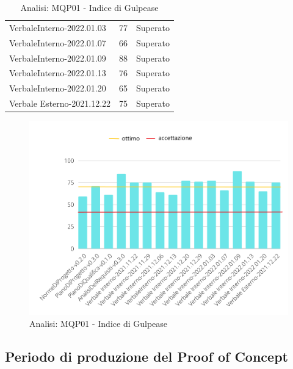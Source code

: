 \begin{table}[H]
\begin{tabular}{m{}<{\centering}  m{}<{\centering}  m{}<{\centering} }
            VerbaleInterno-2022.01.03&
            77 &
            Superato \\
            
            VerbaleInterno-2022.01.07&
            66 &
            Superato \\
            
            VerbaleInterno-2022.01.09&
            88 &
            Superato \\
            
            VerbaleInterno-2022.01.13&
            76 &
            Superato \\
            
            VerbaleInterno-2022.01.20&
            65 &
            Superato \\

            Verbale Esterno-2021.12.22&
            75&
            Superato \\
            
    
    \end{tabular}
    \caption{Periodo di analisi MQP01}

	\begin{figure}[H]
        \centering
        \includegraphics[scale=0.50]{Sezioni/images/analisi-gulpease.png}
        \caption{Analisi: MQP01 - Indice di Gulpease}
    \end{figure}
\end{table}

\subsection{Periodo di produzione del Proof of Concept}

